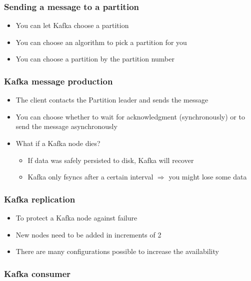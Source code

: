 \documentclass{article}
\begin{document}
\subsubsection{Sending a message to a partition}

\begin{itemize}
    \item You can let Kafka choose a partition
    \item You can choose an algorithm to pick a partition for you
    \item You can choose a partition by the partition number
\end{itemize}

\subsubsection{Kafka message production}

\begin{itemize}
    \item The client contacts the Partition leader and sends the message
    \item You can choose whether to wait for acknowledgment (synchronously) or to send the message asynchronously
    \item What if a Kafka node dies?
    \begin{itemize}
        \item If data was safely persisted to disk, Kafka will recover
        \item Kafka only fsyncs after a certain interval $\Rightarrow$ you might lose some data
    \end{itemize}
\end{itemize}

\subsubsection{Kafka replication}

\begin{itemize}
    \item To protect a Kafka node against failure
    \item New nodes need to be added in increments of 2
    \item There are many configurations possible to increase the availability
\end{itemize}

\subsubsection{Kafka consumer}
\end{document}
